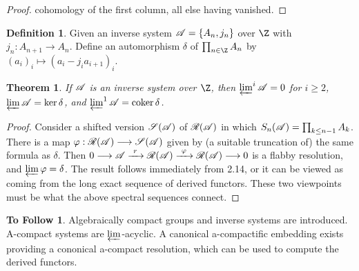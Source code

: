 \documentclass[11pt]{article}
\theoremstyle{plain}
\newtheorem{thm}{Theorem}[subsection]
\theoremstyle{definition}
\newtheorem*{defn*}{Definition}
\newtheorem*{ToFollow}{To Follow}
\begin{document}
{\begin{proof}
cohomology of the first column, all else having vanished.
\end{proof}
\begin{defn*}%
Given an inverse system $\scrA=\{A_n,j_n\}$ over $\Z$ with $j_n:A_{n+1}\to A_n$.
Define an automorphism $\delta$ of $\prod_{n\in\Z}A_n$ by
$(a_i)_i\mapsto(a_i-j_ia_{i+1})_i$.
\end{defn*}
\begin{thm}
If $\scrA$ is an inverse system over $\Z$, then $\varprojlim^i\scrA=0$ for
$i\geq2$, $\varprojlim\scrA=\ker\delta$, and $\varprojlim^1\scrA=\coker\delta$.
\end{thm}
\begin{proof}
Consider a shifted version $\scrS(\scrA)$ of $\scrR(\scrA)$ in which
$S_n(\scrA)=\prod_{k\leq n-1}A_k$. There is a map $\phi:\scrR(\scrA)\to
\scrS(\scrA)$ given by (a suitable truncation of) the same formula as $\delta$.
Then $0\to\scrA\xrightarrow{\ r\ }\scrR(\scrA) \xrightarrow{\ \phi\
}\scrR(\scrA)\to0$ is a flabby resolution, and $\varprojlim\phi=\delta$. The
result follows immediately from 2.14, or it can be viewed as coming from the
long exact sequence of derived functors. These two viewpoints must be what the
above spectral sequences connect.
\end{proof}
\begin{ToFollow}
Algebraically compact groups and inverse systems are introduced. A-compact
systems are $\varprojlim$-acyclic. A canonical a-compactific embedding exists
providing a cononical a-compact resolution, which can be used to compute the
derived functors.
\end{ToFollow}
}   %
\end{document}
